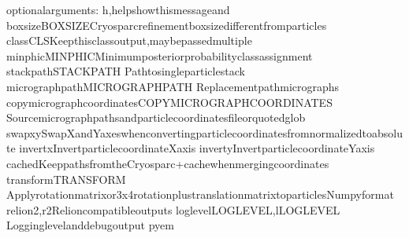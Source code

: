 \documentclass[a4paper,11pt,english]{sphinxmanual}
\begin{document}
\begin{sphinxVerbatim}[commandchars=\\\{\}]
optionalarguments:
\PYGZhy{}h,\PYGZhy{}\PYGZhy{}helpshowthismessageand
\PYGZhy{}\PYGZhy{}boxsizeBOXSIZECryosparcrefinementboxsizedifferentfromparticles
\PYGZhy{}\PYGZhy{}classCLSKeepthisclassoutput,maybepassedmultiple
\PYGZhy{}\PYGZhy{}minphicMINPHICMinimumposteriorprobabilityclassassignment
\PYGZhy{}\PYGZhy{}stack\PYGZhy{}pathSTACK\PYGZus{}PATH
Pathtosingleparticlestack
\PYGZhy{}\PYGZhy{}micrograph\PYGZhy{}pathMICROGRAPH\PYGZus{}PATH
Replacementpathmicrographs
\PYGZhy{}\PYGZhy{}copy\PYGZhy{}micrograph\PYGZhy{}coordinatesCOPY\PYGZus{}MICROGRAPH\PYGZus{}COORDINATES
Sourcemicrographpathsandparticlecoordinatesfileorquotedglob
\PYGZhy{}\PYGZhy{}swapxySwapXandYaxeswhenconvertingparticlecoordinatesfromnormalizedtoabsolute
\PYGZhy{}\PYGZhy{}invertxInvertparticlecoordinateXaxis
\PYGZhy{}\PYGZhy{}invertyInvertparticlecoordinateYaxis
\PYGZhy{}\PYGZhy{}cachedKeeppathsfromtheCryosparc+cachewhenmergingcoordinates
\PYGZhy{}\PYGZhy{}transformTRANSFORM
Applyrotationmatrixor3x4rotationplustranslationmatrixtoparticlesNumpyformat
\PYGZhy{}\PYGZhy{}relion2,\PYGZhy{}r2Relioncompatibleoutputs
\PYGZhy{}\PYGZhy{}loglevelLOGLEVEL,\PYGZhy{}lLOGLEVEL
Logginglevelanddebugoutput
pyem\PYGZdl{}\PYGZgt{}
\end{sphinxVerbatim}
\end{document}
